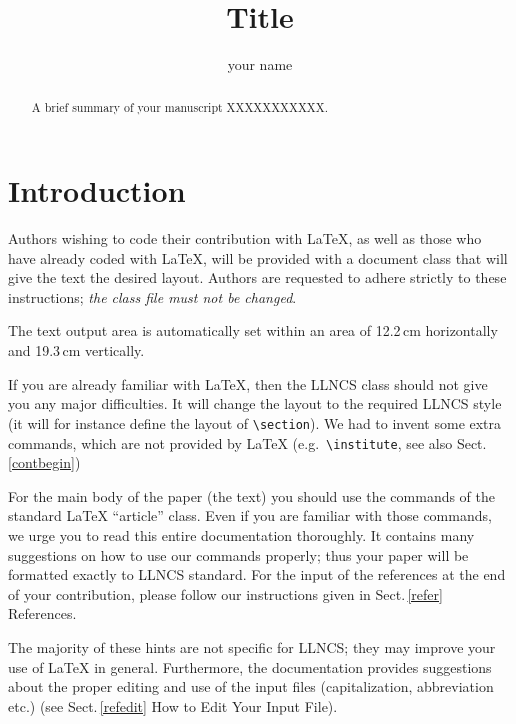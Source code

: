 \documentclass{llncs}
\begin{document}
%
%
\title{Title}
\author{your name}
\maketitle

\begin{abstract}
A brief summary of your manuscript XXXXXXXXXXX.
\end{abstract}

\section{Introduction}
%
Authors wishing to code their contribution
with \LaTeX{}, as well as those who have already coded with \LaTeX{},
will be provided with a document class that will give the text the
desired layout. Authors are requested to
adhere strictly to these instructions; {\em the class
file must not be changed}.

The text output area is automatically set within an area of
12.2\,cm horizontally  and 19.3\,cm vertically.

If you are already familiar with \LaTeX{}, then the
LLNCS class should not give you any major difficulties.
It will change the layout to the required LLNCS style
(it will for instance define the layout of \verb|\section|).
We had to invent some extra commands,
which are not provided by \LaTeX{} (e.g.\
\verb|\institute|, see also Sect.\,\ref{contbegin})

For the main body of the paper (the text) you
should use the commands of the standard \LaTeX{} ``article'' class.
Even if you are familiar with those commands, we urge you to read
this entire documentation thoroughly. It contains many suggestions on
how to use our commands properly; thus your paper
will be formatted exactly to LLNCS standard.
For the input of the references at the end of your contribution,
please follow our instructions given in Sect.\,\ref{refer} References.

The majority of these hints are not specific for LLNCS; they may improve
your use of \LaTeX{} in general.
Furthermore, the documentation provides suggestions about the proper
editing and use
of the input files (capitalization, abbreviation etc.) (see
Sect.\,\ref{refedit} How to Edit Your Input File).
%
\end{document}
